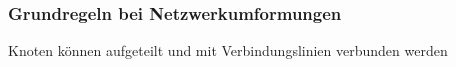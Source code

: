 					\subsubsection{Grundregeln bei Netzwerkumformungen}
\fix \fix
					\beginip
					 	Knoten können aufgeteilt und mit Verbindungslinien verbunden werden\\
						\begin{center}
						\end{center}
					\iend

